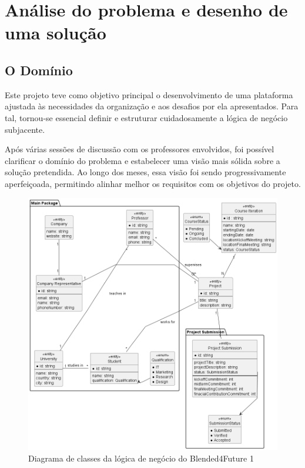 \chapter{Análise do problema e desenho de uma solução}
\label{chap:analisedoproblema}

\section{O Domínio}

Este projeto teve como objetivo principal o desenvolvimento de uma plataforma ajustada às necessidades da organização e aos desafios por ela apresentados. Para tal, tornou-se essencial definir e estruturar cuidadosamente a lógica de negócio subjacente.

Após várias sessões de discussão com os professores envolvidos, foi possível clarificar o domínio do problema e estabelecer uma visão mais sólida sobre a solução pretendida. Ao longo dos meses, essa visão foi sendo progressivamente aperfeiçoada, permitindo alinhar melhor os requisitos com os objetivos do projeto.

\begin{figure}    
    \centering
    \includegraphics[width=\linewidth]{capitulos/cap3-analisedoproblema/assets/domain-diagram/dd.png}
    \caption{Diagrama de classes da lógica de negócio do Blended4Future 1}
    \label{fig:dd}
\end{figure}


